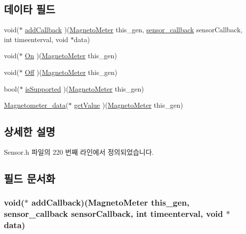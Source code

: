 \subsection*{데이타 필드}
\begin{DoxyCompactItemize}
\item 
void($\ast$ \hyperlink{struct___magneto_meter_a9181e28db7a7c1bc776db231010abe84}{add\-Callback} )(\hyperlink{_sensor_8h_ad8c508f6ecfa0fb3f0cc332431821142}{Magneto\-Meter} this\-\_\-gen, \hyperlink{_sensor_8h_ad8114207845fc5e0aa30832f0c718cd6}{sensor\-\_\-callback} sensor\-Callback, int timeenterval, void $\ast$data)
\item 
void($\ast$ \hyperlink{struct___magneto_meter_adaae4fb51ff33457e414eb8924c85075}{On} )(\hyperlink{_sensor_8h_ad8c508f6ecfa0fb3f0cc332431821142}{Magneto\-Meter} this\-\_\-gen)
\item 
void($\ast$ \hyperlink{struct___magneto_meter_ae74e6adbf008d638c954bf852fef4657}{Off} )(\hyperlink{_sensor_8h_ad8c508f6ecfa0fb3f0cc332431821142}{Magneto\-Meter} this\-\_\-gen)
\item 
bool($\ast$ \hyperlink{struct___magneto_meter_aac07cae3561bfd9df065be55fb79f145}{is\-Supported} )(\hyperlink{_sensor_8h_ad8c508f6ecfa0fb3f0cc332431821142}{Magneto\-Meter} this\-\_\-gen)
\item 
\hyperlink{_sensor_8h_afbe589975942218ce5662af2ba07d106}{Magnetometer\-\_\-data}($\ast$ \hyperlink{struct___magneto_meter_a481059371d9d2a273df0fabe18e388a0}{get\-Value} )(\hyperlink{_sensor_8h_ad8c508f6ecfa0fb3f0cc332431821142}{Magneto\-Meter} this\-\_\-gen)
\end{DoxyCompactItemize}


\subsection{상세한 설명}


Sensor.\-h 파일의 220 번째 라인에서 정의되었습니다.



\subsection{필드 문서화}
\hypertarget{struct___magneto_meter_a9181e28db7a7c1bc776db231010abe84}{
\subsubsection[{add\-Callback}]{\setlength{\rightskip}{0pt plus 5cm}void($\ast$  add\-Callback)({\bf Magneto\-Meter} this\-\_\-gen, {\bf sensor\-\_\-callback} sensor\-Callback, int timeenterval, void $\ast$data)}}\label{struct___magneto_meter_a9181e28db7a7c1bc776db231010abe84}


